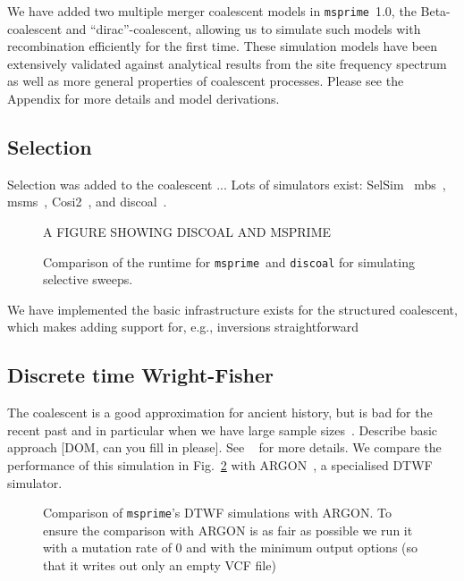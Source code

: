 \documentclass{article}
\newcommand{\msprime}[0]{\texttt{msprime}}
\begin{document}
We have added two multiple merger coalescent models in \msprime\ 1.0, the
Beta-coalescent and ``dirac''-coalescent, allowing us to simulate
such models with recombination efficiently for the first time.
These simulation models have been extensively validated against
analytical results from the site frequency
spectrum~\citep{birkner2013statistical,blath2016site,hobolth2019phase}
 as well as more general properties of coalescent processes.
Please see the Appendix for more details and model derivations.

\subsection{Selection}
Selection was added to the coalescent ... Lots of simulators exist:
SelSim~\citep{spencer2004selsim}
mbs~\citep{teshima2009mbs},
msms~\citep{ewing2010msms},
Cosi2~\citep{shlyakhter2014cosi2},
and discoal~\citep{kern2016discoal}.

\begin{figure}
\Large{A FIGURE SHOWING DISCOAL AND MSPRIME}
\caption{\label{fig-selection-perf}Comparison of the runtime for
\msprime\ and \texttt{discoal} for simulating selective sweeps.
}
\end{figure}

We have implemented the basic infrastructure exists for the structured
coalescent, which makes adding support for, e.g.,
inversions straightforward~\citep{peischl2013sequential}

\subsection{Discrete time Wright-Fisher}
The coalescent is a good approximation for ancient history, but
is bad for the recent past and in particular when we have large
sample
sizes~\citep{wakeley2012gene,bhaskar2014distortion,nelson2020accounting}.
Describe basic
approach [DOM, can you fill in please].
See ~\cite{nelson2020accounting} for more details.
We compare the performance of this simulation in Fig.~\ref{fig-dtwf-perf}
with ARGON~\citep{palamara2016argon}, a specialised DTWF simulator.

\begin{figure}
\begin{center}
\end{center}
\caption{\label{fig-dtwf-perf} Comparison of \msprime's DTWF
simulations with ARGON. To ensure the comparison with ARGON is
as fair as possible we run it with a mutation rate of 0 and with
the minimum output options (so that it writes out only an empty VCF file)}
\end{figure}
\end{document}

